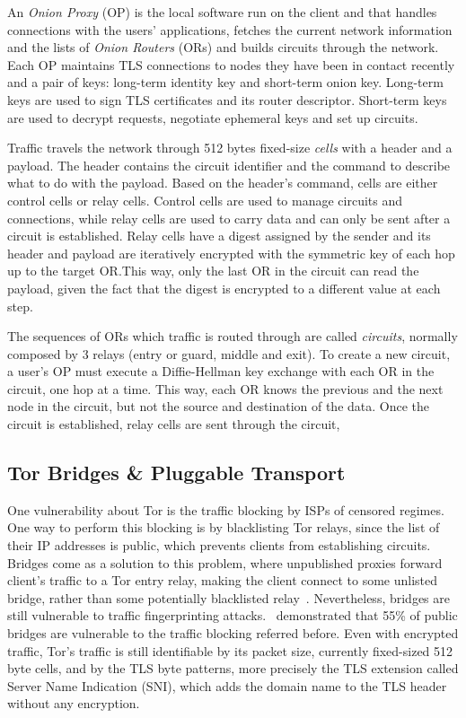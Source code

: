An \textit{Onion Proxy} (OP) is the local software run on the client and that handles connections with the users' applications, fetches the current network information and the lists of \textit{Onion Routers} (ORs) and builds circuits through the network. Each OP maintains TLS connections to nodes they have been in contact recently and a pair of keys: long-term identity key and short-term onion key. Long-term keys are used to sign TLS certificates and its router descriptor. Short-term keys are used to decrypt requests, negotiate ephemeral keys and set up circuits.

Traffic travels the network through 512 bytes fixed-size \textit{cells} with a header and a payload. The header contains the circuit identifier and the command to describe what to do with the payload. Based on the header's command, cells are either control cells or relay cells. Control cells are used to manage circuits and connections, while relay cells are used to carry data and can only be sent after a circuit is established. Relay cells have a digest assigned by the sender and its header and payload are iteratively encrypted with the symmetric key of each hop up to the target OR.\@ This way, only the last OR in the circuit can read the payload, given the fact that the digest is encrypted to a different value at each step.

The sequences of ORs which traffic is routed through are called \textit{circuits}, normally composed by 3 relays (entry or guard, middle and exit).
To create a new circuit, a user's OP must execute a Diffie-Hellman key exchange with each OR in the circuit, one hop at a time. This way, each OR knows the previous and the next node in the circuit, but not the source and destination of the data. Once the circuit is established, relay cells are sent through the circuit, 

\subsection{Tor Bridges \& Pluggable Transport}\label{subsec:tor_bridges}

One vulnerability about Tor is the traffic blocking by ISPs of censored regimes. One way to perform this blocking is by blacklisting Tor relays, since the list of their IP addresses is public, which prevents clients from establishing circuits. Bridges come as a solution to this problem, where unpublished proxies forward client's traffic to a Tor entry relay, making the client connect to some unlisted bridge, rather than some potentially blacklisted relay~\cite{Matic2017DissectingTB}.
Nevertheless, bridges are still vulnerable to traffic fingerprinting attacks.~\citeauthor{Matic2017DissectingTB} demonstrated that 55\% of public bridges are vulnerable to the traffic blocking referred before. Even with encrypted traffic, Tor's traffic is still identifiable by its packet size, currently fixed-sized 512 byte cells, and by the TLS byte patterns, more precisely the TLS extension called Server Name Indication (SNI), which adds the domain name to the TLS header without any encryption.

